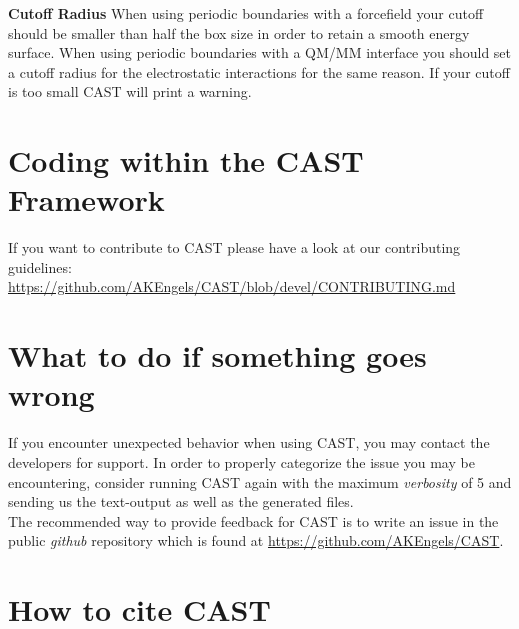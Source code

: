 \documentclass[10pt,a4paper]{article} %
\begin{document}
    \textbf{Cutoff Radius} When using periodic boundaries with a forcefield your cutoff should be smaller than half the box size in order to retain a smooth energy surface. When using periodic boundaries with a QM/MM interface you should set a cutoff radius for the electrostatic interactions for the same reason. If your cutoff is too small CAST will print a warning.


	\newpage
	\section{Coding within the CAST Framework}

    If you want to contribute to CAST please have a look at our contributing guidelines: \url{https://github.com/AKEngels/CAST/blob/devel/CONTRIBUTING.md}

	\newpage
	\section{What to do if something goes wrong}
	If you encounter unexpected behavior when using \ac{CAST}, you may contact the developers for support. In order to properly categorize the issue you may be encountering, consider running \ac{CAST} again with the maximum \textit{verbosity} of 5 and sending us the text-output as well as the generated files. \\

    The recommended way to provide feedback for CAST is to write an issue in the public \textit{github} repository which is found at \url{https://github.com/AKEngels/CAST}.
    

	\newpage
	\section{How to cite CAST}
\end{document}
